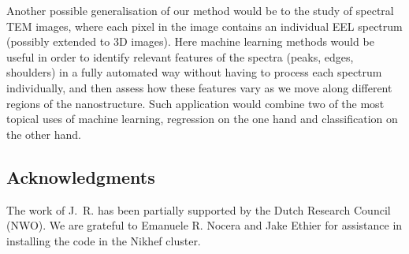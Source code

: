 Another possible generalisation of our method would be to the study of spectral TEM images,
where each pixel in the image contains an individual EEL spectrum (possibly
extended to 3D images).
%
Here machine learning methods would be useful in order
to  identify relevant features of the spectra (peaks, edges, shoulders) in a fully
automated way
without having to process each spectrum individually, and then assess
how these features vary as we move along different regions of the
nanostructure.
%
Such application would combine two of the most topical uses of machine learning, regression
on the one hand and classification on the other hand.

\subsection*{Acknowledgments}
%
The work of J.~R. has been partially supported by the
Dutch Research Council (NWO).
%
We are grateful to Emanuele R. Nocera and Jake Ethier for
assistance in installing the code in the Nikhef cluster.
